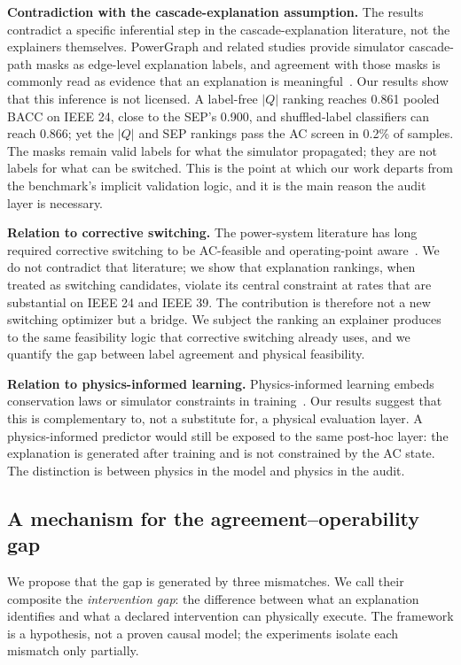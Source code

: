 \textbf{Contradiction with the cascade-explanation assumption.} The results contradict a specific inferential step in the cascade-explanation literature, not the explainers themselves. PowerGraph and related studies provide simulator cascade-path masks as edge-level explanation labels, and agreement with those masks is commonly read as evidence that an explanation is meaningful~\citep{varbella2024}. Our results show that this inference is not licensed. A label-free $|Q|$ ranking reaches 0.861 pooled BACC on IEEE 24, close to the SEP's 0.900, and shuffled-label classifiers can reach 0.866; yet the $|Q|$ and SEP rankings pass the AC screen in 0.2\% of samples. The masks remain valid labels for what the simulator propagated; they are not labels for what can be switched. This is the point at which our work departs from the benchmark's implicit validation logic, and it is the main reason the audit layer is necessary.

\textbf{Relation to corrective switching.} The power-system literature has long required corrective switching to be AC-feasible and operating-point aware~\citep{rolim1999,li2019,korad2013,li2017}. We do not contradict that literature; we show that explanation rankings, when treated as switching candidates, violate its central constraint at rates that are substantial on IEEE 24 and IEEE 39. The contribution is therefore not a new switching optimizer but a bridge. We subject the ranking an explainer produces to the same feasibility logic that corrective switching already uses, and we quantify the gap between label agreement and physical feasibility.

\textbf{Relation to physics-informed learning.} Physics-informed learning embeds conservation laws or simulator constraints in training~\citep{misyris2020,xu2023}. Our results suggest that this is complementary to, not a substitute for, a physical evaluation layer. A physics-informed predictor would still be exposed to the same post-hoc layer: the explanation is generated after training and is not constrained by the AC state. The distinction is between physics in the model and physics in the audit.

\subsection{A mechanism for the agreement--operability gap}\label{discussion_mechanism}

We propose that the gap is generated by three mismatches. We call their composite the \emph{intervention gap}: the difference between what an explanation identifies and what a declared intervention can physically execute. The framework is a hypothesis, not a proven causal model; the experiments isolate each mismatch only partially.

